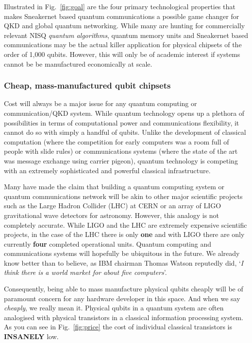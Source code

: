 \documentclass[twocolumn, aps, rmp, amsmath, amssymb, nofootinbib, superscriptaddress, longbibliography, floatfix, table-of-contents, eqsecnum]{revtex4-2}
\begin{document}
Illustrated in Fig.~\ref{fig:goal} are the four primary technological properties that makes Sneakernet based quantum communications a possible game changer for QKD and global quantum networking. While many are hunting for commercially relevant NISQ \textit{quantum algorithms}, quantum memory units and Sneakernet based communications may be the actual killer application for physical chipsets of the order of 1,000 qubits. However, this will only be of academic interest if systems cannot be be manufactured economically at scale.

\subsubsection{Cheap, mass-manufactured qubit chipsets}

Cost will always be a major issue for any quantum computing or communication/QKD system. While quantum technology opens up a plethora of possibilities in terms of computational power and communications flexibility, it cannot do so with simply a handful of qubits. Unlike the development of classical computation (where the competition for early computers was a room full of people with slide rules) or communications systems (where the state of the art was message exchange using carrier pigeon), quantum technology is competing with an extremely sophisticated and powerful classical infrastructure. 

Many have made the claim that building a quantum computing system or quantum communications network will be akin to other major scientific projects such as the Large Hadron Collider (LHC) at CERN or an array of LIGO gravitational wave detectors for astronomy. However, this analogy is not completely accurate. While LIGO and the LHC are extremely expensive scientific projects, in the case of the LHC there is only \textbf{one} and with LIGO there are only currently \textbf{four} completed operational units. Quantum computing and communications systems will hopefully be ubiquitous in the future. We already know better than to believe, as IBM chairman Thomas Watson reputedly did, `\textit{I think there is a world market for about five computers}'. 

Consequently, being able to mass manufacture physical qubits cheaply will be of paramount concern for any hardware developer in this space. And when we say \textit{cheaply}, we really mean it. Physical qubits in a quantum system are often analogised with physical transistors in a classical information processing system. As you can see in Fig.~\ref{fig:price} the cost of individual classical transistors is \textbf{INSANELY} low. 
 
\end{document}

